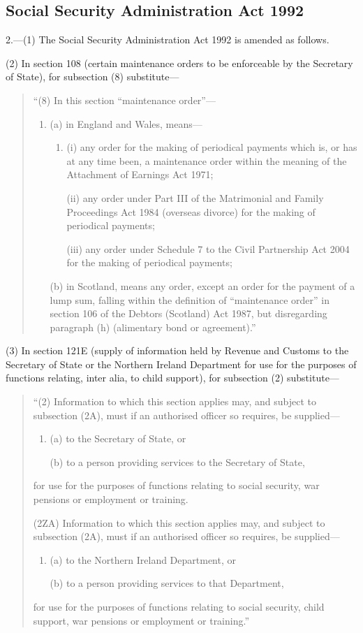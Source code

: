 \documentclass[a4paper]{article}
\begin{document}
\subsection*{Social Security Administration Act 1992}

2.---(1) The Social Security Administration Act 1992 is amended as follows.

(2) In section 108 (certain maintenance orders to be enforceable by the Secretary of State), for subsection (8) substitute—
\begin{quotation}
“(8) In this section “maintenance order”—
\begin{enumerate}\item[]
(a) in England and Wales, means—
\begin{enumerate}\item[]
(i) any order for the making of periodical payments which is, or has at any time been, a maintenance order within the meaning of the Attachment of Earnings Act 1971;

(ii) any order under Part III of the Matrimonial and Family Proceedings Act 1984 (overseas divorce) for the making of periodical payments;

(iii) any order under Schedule 7 to the Civil Partnership Act 2004 for the making of periodical payments;
\end{enumerate}

(b) in Scotland, means any order, except an order for the payment of a lump sum, falling within the definition of “maintenance order” in section 106 of the Debtors (Scotland) Act 1987, but disregarding paragraph (h) (alimentary bond or agreement).”
\end{enumerate}
\end{quotation}

(3) In section 121E (supply of information held by Revenue and Customs to the Secretary of State or the Northern Ireland Department for use for the purposes of functions relating, inter alia, to child support), for subsection (2) substitute—
\begin{quotation}
“(2) Information to which this section applies may, and subject to subsection (2A), must if an authorised officer so requires, be supplied—
\begin{enumerate}\item[]
(a) to the Secretary of State, or

(b) to a person providing services to the Secretary of State,
\end{enumerate}
for use for the purposes of functions relating to social security, war pensions or employment or training.

(2ZA) Information to which this section applies may, and subject to subsection (2A), must if an authorised officer so requires, be supplied—
\begin{enumerate}\item[]
(a) to the Northern Ireland Department, or

(b) to a person providing services to that Department,
\end{enumerate}
for use for the purposes of functions relating to social security, child support, war pensions or employment or training.”
\end{quotation}
\end{document}
